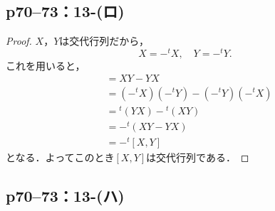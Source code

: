 \documentclass[a4paper,10pt,fleqn]{ltjsarticle}
\begin{document}
\subsection*{p70--73：13-(ロ)}

\begin{tleftbar}
  \begin{proof}
    $X$，$Y$は交代行列だから，
    \[
      X=- {}^t X ,\quad Y = -{}^t Y .
    \]
    これを用いると，
    \begin{align*}
      [X,Y] & = XY -YX                                   \\
            & = (-{}^t X) (-{}^t Y) - (-{}^t Y)(-{}^t X) \\
            & = {}^t (YX) - {}^t (XY)                    \\
            & = -{}^t (XY-YX)                            \\
            & = -{}^t [X,Y]
    \end{align*}
    となる．よってこのとき$[X,Y]$は交代行列である．
  \end{proof}
\end{tleftbar}

\newpage

\subsection*{p70--73：13-(ハ)}
\end{document}
